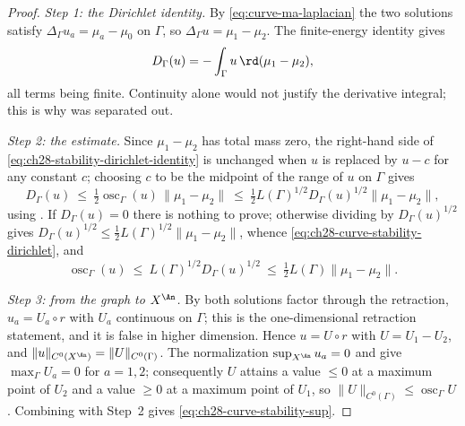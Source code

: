 \begin{proof}
\emph{Step 1: the Dirichlet identity.}  By
\eqref{eq:curve-ma-laplacian} the two solutions satisfy
$\Delta_\Gamma u_a=\mu_a-\mu_0$ on $\Gamma$, so
$\Delta_\Gamma u=\mu_1-\mu_2$.  The finite-energy identity
 gives
\begin{equation}
\label{eq:ch28-stability-dirichlet-identity}
 D_\Gamma(u)=-\int_\Gamma u\,\rd(\mu_1-\mu_2),
\end{equation}
all terms being finite.  Continuity alone would not justify the derivative
integral; this is why  was separated out.

\emph{Step 2: the estimate.}  Since $\mu_1-\mu_2$ has total mass zero, the
right-hand side of
\eqref{eq:ch28-stability-dirichlet-identity} is unchanged when $u$ is
replaced by $u-c$ for any constant $c$; choosing $c$ to be the
midpoint of the range of $u$ on $\Gamma$ gives
\[
 D_\Gamma(u)\ \leq\ \tfrac12\operatorname{osc}_\Gamma(u)\,
 \lVert\mu_1-\mu_2\rVert
 \ \leq\ \tfrac12L(\Gamma)^{1/2}D_\Gamma(u)^{1/2}
   \lVert\mu_1-\mu_2\rVert ,
\]
using .  If $D_\Gamma(u)=0$ there is nothing
to prove; otherwise dividing by $D_\Gamma(u)^{1/2}$ gives
$D_\Gamma(u)^{1/2}\leq\tfrac12L(\Gamma)^{1/2}
\lVert\mu_1-\mu_2\rVert$, whence
\eqref{eq:ch28-curve-stability-dirichlet}, and
\[
 \operatorname{osc}_\Gamma(u)\ \leq\ L(\Gamma)^{1/2}D_\Gamma(u)^{1/2}
 \ \leq\ \tfrac12 L(\Gamma)\lVert\mu_1-\mu_2\rVert .
\]

\emph{Step 3: from the graph to $X^{\An}$.}  By
 both solutions factor through the retraction,
$u_a=U_a\circ r$ with $U_a$ continuous on $\Gamma$; this is the
one-dimensional retraction statement, and it is false in higher dimension.
Hence $u=U\circ r$ with $U=U_1-U_2$, and
$\lVert u\rVert_{C^0(X^{\An})}=\lVert U\rVert_{C^0(\Gamma)}$.  The
normalization $\sup_{X^{\An}}u_a=0$ and
 give $\max_\Gamma U_a=0$ for
$a=1,2$; consequently $U$ attains a value $\leq0$ at a maximum point
of $U_2$ and a value $\geq0$ at a maximum point of $U_1$, so
$\lVert U\rVert_{C^0(\Gamma)}\leq\operatorname{osc}_\Gamma U$.  Combining
with Step~2 gives \eqref{eq:ch28-curve-stability-sup}.


\end{proof}

